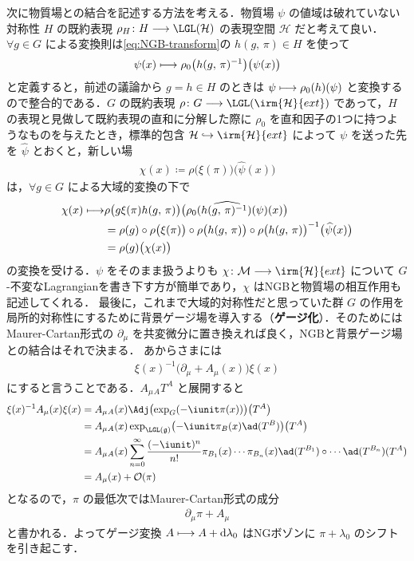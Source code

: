 \documentclass[TQFT_main]{subfiles}
\begin{document}
次に物質場との結合を記述する方法を考える．物質場 $\psi$ の値域は破れていない対称性 $H$ の既約表現 $\rho_H \colon H \lto \LGL(\mathcal{H})$ の表現空間 $\mathcal{H}$ だと考えて良い．$\forall g \in G$ による変換則は\eqref{eq:NGB-transform}の $h(g,\, \pi) \in H$ を使って
\begin{align}
    \label{eq:NGB-matter}
    \psi(x) \longmapsto \rho_0 \bigl( h(g,\, \pi)^{-1} \bigr) \bigl( \psi(x) \bigr) 
\end{align}
と定義すると，前述の議論から $g = h \in H$ のときは $\psi \longmapsto \rho_0(h)(\psi)$ と変換するので整合的である．$G$ の既約表現 $\rho \colon G \lto \LGL(\irm{\mathcal{H}}{ext})$ であって，$H$ の表現と見做して既約表現の直和に分解した際に $\rho_0$ を直和因子の1つに持つようなものを与えたとき，標準的包含 $\mathcal{H} \hookrightarrow \irm{\mathcal{H}}{ext}$ によって $\psi$ を送った先を $\widehat{\psi}$ とおくと，新しい場
\begin{align}
    \chi(x) \coloneqq  \rho \bigl( \xi(\pi) \bigr) \bigl( \widehat{\psi}(x) \bigr) 
\end{align}
は，$\forall g \in G$ による大域的変換の下で
\begin{align}
    \chi(x)
    \longmapsto 
    &\rho \bigl( g\xi(\pi) h(g,\, \pi) \bigr) \bigl( \widehat{\rho_0(h(g,\, \pi)^{-1})(\psi)}(x) \bigr) \\
    &=\rho (g) \circ \rho\bigl(\xi(\pi)\bigr) \circ \rho \bigl(h(g,\, \pi) \bigr) \circ \rho\bigl(h(g,\, \pi)\bigr)^{-1}\bigl(\widehat{\psi}(x) \bigr) \\
    &=\rho(g) \bigl( \chi(x) \bigr) 
\end{align}
の変換を受ける．$\psi$ をそのまま扱うよりも $\chi \colon \mathcal{M} \lto \irm{\mathcal{H}}{ext}$ について $G$-不変なLagrangianを書き下す方が簡単であり，$\chi$ はNGBと物質場の相互作用も記述してくれる．
最後に，これまで大域的対称性だと思っていた群 $G$ の作用を局所的対称性にするために背景ゲージ場を導入する（\textbf{ゲージ化}）．そのためにはMaurer-Cartan形式の $\partial_\mu$ を共変微分に置き換えれば良く，NGBと背景ゲージ場との結合はそれで決まる．
あからさまには
\begin{align}
    \xi(x)^{-1} \bigl(\partial_\mu + A_\mu(x)\bigr) \xi(x)
\end{align}
にすると言うことである．$A_\mu{}_A T^A$ と展開すると
\begin{align}
    \xi(x)^{-1} A_\mu(x) \xi(x)
    &= A_\mu{}_A(x) \Adj \bigl( \exp_G(-\iunit \pi(x)) \bigr) \bigl( T^A \bigr) \\
    &= A_\mu{}_A(x) \exp_{\LGL(\mathfrak{g})} \bigl( - \iunit \pi_B(x) \ad(T^B)  \bigr) \bigl( T^A \bigr) \\
    &= A_\mu{}_A(x) \sum_{n=0}^\infty \frac{(-\iunit)^n}{n!} \pi_{B_1}(x) \cdots \pi_{B_n}(x) \ad(T^{B_1}) \circ \cdots \ad(T^{B_n})(T^A) \\
    &= A_\mu(x) + \order{\pi}
\end{align}
となるので，$\pi$ の最低次ではMaurer-Cartan形式の成分
\begin{align}
    \partial_\mu \pi + A_\mu
\end{align}
と書かれる．よってゲージ変換 $A \longmapsto A + \dd{\lambda_0}$ はNGボゾンに $\pi + \lambda_0$ のシフトを引き起こす．
\end{document}
